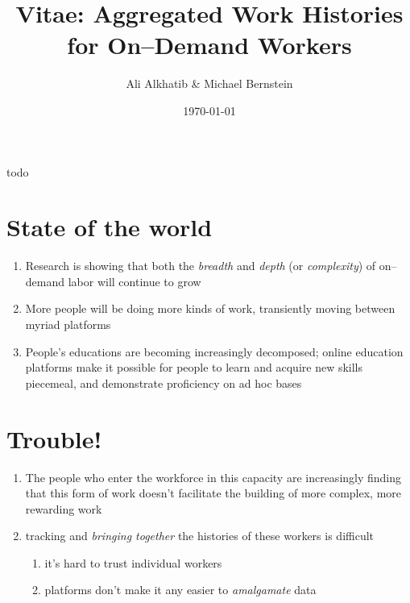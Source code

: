 \documentclass[10pt]{article}
\title{Vitae: Aggregated Work Histories for On--Demand Workers}
\author{Ali Alkhatib \& Michael Bernstein}
\date{\today}
\makeatletter
\renewcommand{\maketitle}{\bgroup\setlength{\parindent}{0pt}
\begin{flushleft}
  {\scshape \Large \textbf{\@title}}

  \vspace{1ex}

  \@author
\end{flushleft}\egroup
}
\renewenvironment{abstract}{%
\hfill\begin{minipage}{0.95\textwidth}
\itshape
}
{
\bigskip
\end{minipage}}
\makeatother
\begin{document}
  \maketitle

\begin{abstract}
todo
\end{abstract}


\section*{State of the world}
\begin{enumerate}[noitemsep]
  \item Research is showing that both the \textit{breadth} and \textit{depth} (or \textit{complexity})
        of on--demand labor will continue to grow
  \item More people will be doing more kinds of work, transiently moving between myriad platforms
  \item People's educations are becoming increasingly decomposed;
  online education platforms make it possible for people to learn and acquire new skills piecemeal,
  and demonstrate proficiency on ad hoc bases
\end{enumerate}

\section*{Trouble!}
\begin{enumerate}[noitemsep]
  \item The people who enter the workforce in this capacity are increasingly finding that
        this form of work doesn't facilitate the building of more complex, more rewarding work
  \item tracking and \textit{bringing together} the histories of these workers is difficult
  \begin{enumerate}[noitemsep]
    \item it's hard to trust individual workers
    \item platforms don't make it any easier to \textit{amalgamate} data
  \end{enumerate}
\end{enumerate}
\end{document}
